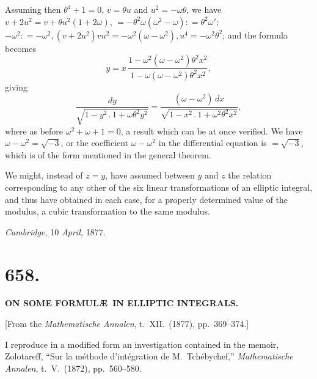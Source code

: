 \documentclass[11pt,a4paper]{article}
\begin{document}
Assuming then $\theta^{4} + 1 = 0$, $v = \theta u$ and $u^{2} = -\omega\theta$, we have $v + 2u^{2} = v + \theta u^{2}(1 + 2\omega)$, $= -\theta^{2}\omega(\omega^{2} - \omega) : = \theta^{2}\omega'$; $-\omega^{2}: = -\omega^{2}, (v + 2u^{2})vu^{2} = -\omega^{2}(\omega - \omega^{2}), u^{4} = -\omega^{2}\theta^{2}$; and the formula becomes
\[
y = x\,\frac{1 - \omega^{2}(\omega - \omega^{2})\theta^{2}x^{2}}{1 - \omega(\omega - \omega^{2})\theta^{2}x^{2}},
\]
giving
\[
\frac{dy}{\sqrt{1 - y^{2}\,.\,1 + \omega\theta^{2}y^{2}}} = \frac{(\omega - \omega^{2})\,dx}{\sqrt{1 - x^{2}\,.\,1 + \omega^{2}\theta^{2}x^{2}}},
\]
where as before $\omega^{2} + \omega + 1 = 0$, a result which can be at once verified. We have $\omega - \omega^{2} = \sqrt{-3}$, or the coefficient $\omega - \omega^{2}$ in the differential equation is $= \sqrt{-3}$, which is of the form mentioned in the general theorem.

We might, instead of $z = y$, have assumed between $y$ and $z$ the relation corresponding to any other of the six linear transformations of an elliptic integral, and thus have obtained in each case, for a properly determined value of the modulus, a cubic transformation to the same modulus.

\medskip

\hfill \emph{Cambridge,} 10 \emph{April,} 1877.

\newpage


\section*{658.}

\begin{center}
\textbf{ON SOME FORMUL\AE\ IN ELLIPTIC INTEGRALS.}
\end{center}

\medskip

\begin{center}
[From the \emph{Mathematische Annalen}, t.~XII.\ (1877), pp.~369--374.]
\end{center}

\medskip

\noindent I reproduce in a modified form an investigation contained in the memoir, Zolotareff, ``Sur la m\'ethode d'int\'egration de M.~Tch\'ebychef,'' \emph{Mathematische Annalen}, t.~V.\ (1872), pp.~560--580.
\end{document}

